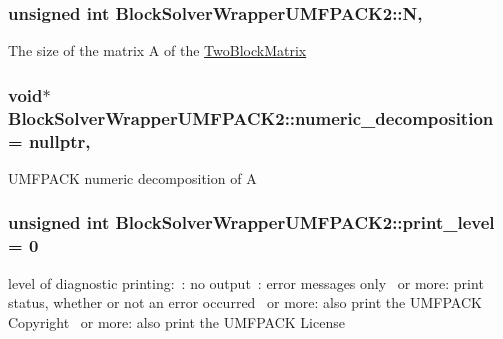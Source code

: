 \subsubsection[{\texorpdfstring{N}{N}}]{\setlength{\rightskip}{0pt plus 5cm}unsigned int Block\+Solver\+Wrapper\+U\+M\+F\+P\+A\+C\+K2\+::N\hspace{0.3cm}{\ttfamily [mutable]}, {\ttfamily [private]}}\hypertarget{class_block_solver_wrapper_u_m_f_p_a_c_k2_a85d397826a36330bf3602d510acdd8d4}{}\label{class_block_solver_wrapper_u_m_f_p_a_c_k2_a85d397826a36330bf3602d510acdd8d4}
The size of the matrix A of the \hyperlink{class_two_block_matrix}{Two\+Block\+Matrix} 
\subsubsection[{\texorpdfstring{numeric\+\_\+decomposition}{numeric_decomposition}}]{\setlength{\rightskip}{0pt plus 5cm}void$\ast$ Block\+Solver\+Wrapper\+U\+M\+F\+P\+A\+C\+K2\+::numeric\+\_\+decomposition = nullptr\hspace{0.3cm}{\ttfamily [mutable]}, {\ttfamily [private]}}\hypertarget{class_block_solver_wrapper_u_m_f_p_a_c_k2_ac3a439162324f36f5162439c075d02eb}{}\label{class_block_solver_wrapper_u_m_f_p_a_c_k2_ac3a439162324f36f5162439c075d02eb}
U\+M\+F\+P\+A\+CK numeric decomposition of A 
\subsubsection[{\texorpdfstring{print\+\_\+level}{print_level}}]{\setlength{\rightskip}{0pt plus 5cm}unsigned int Block\+Solver\+Wrapper\+U\+M\+F\+P\+A\+C\+K2\+::print\+\_\+level = 0}\hypertarget{class_block_solver_wrapper_u_m_f_p_a_c_k2_af78261735f66012f531c3a71c9640d2c}{}\label{class_block_solver_wrapper_u_m_f_p_a_c_k2_af78261735f66012f531c3a71c9640d2c}
level of diagnostic printing\+:~\+: no output~\+: error messages only~ or more\+: print status, whether or not an error occurred~ or more\+: also print the U\+M\+F\+P\+A\+CK Copyright~ or more\+: also print the U\+M\+F\+P\+A\+CK License 
